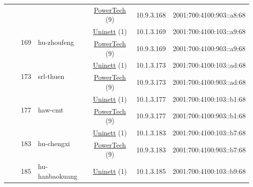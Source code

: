 \begin{small}
\begin{center}
\begin{longtable}{|c|c|c|c|c|c|c|c|}
  &  &  &  & \multicolumn{2}{|c|}{\tiny{\href{http://www.powertech.no}{PowerTech} (9)}} & \tiny{10.9.3.168} & \tiny{2001:700:4100:903::a8:68} \\* \cline{3-3}\cline{4-4}\cline{5-5}\cline{6-6}\cline{7-7}\cline{8-8}
  &  & \multirow{2}{*}{\tiny{169}} & \multicolumn{1}{|l|}{\multirow{2}{*}{\tiny{hu-zhoufeng}}} & \multicolumn{2}{|c|}{\tiny{\href{https://www.uninett.no}{Uninett} (1)}} & \tiny{10.1.3.169} & \tiny{2001:700:4100:103::a9:68} \\* \cline{5-5}\cline{6-6}\cline{7-7}\cline{8-8}
  &  &  &  & \multicolumn{2}{|c|}{\tiny{\href{http://www.powertech.no}{PowerTech} (9)}} & \tiny{10.9.3.169} & \tiny{2001:700:4100:903::a9:68} \\* \cline{3-3}\cline{4-4}\cline{5-5}\cline{6-6}\cline{7-7}\cline{8-8}
  &  & \multirow{2}{*}{\tiny{173}} & \multicolumn{1}{|l|}{\multirow{2}{*}{\tiny{srl-thuen}}} & \multicolumn{2}{|c|}{\tiny{\href{https://www.uninett.no}{Uninett} (1)}} & \tiny{10.1.3.173} & \tiny{2001:700:4100:103::ad:68} \\* \cline{5-5}\cline{6-6}\cline{7-7}\cline{8-8}
  &  &  &  & \multicolumn{2}{|c|}{\tiny{\href{http://www.powertech.no}{PowerTech} (9)}} & \tiny{10.9.3.173} & \tiny{2001:700:4100:903::ad:68} \\* \cline{3-3}\cline{4-4}\cline{5-5}\cline{6-6}\cline{7-7}\cline{8-8}
  &  & \multirow{2}{*}{\tiny{177}} & \multicolumn{1}{|l|}{\multirow{2}{*}{\tiny{haw-cmt}}} & \multicolumn{2}{|c|}{\tiny{\href{https://www.uninett.no}{Uninett} (1)}} & \tiny{10.1.3.177} & \tiny{2001:700:4100:103::b1:68} \\* \cline{5-5}\cline{6-6}\cline{7-7}\cline{8-8}
  &  &  &  & \multicolumn{2}{|c|}{\tiny{\href{http://www.powertech.no}{PowerTech} (9)}} & \tiny{10.9.3.177} & \tiny{2001:700:4100:903::b1:68} \\* \cline{3-3}\cline{4-4}\cline{5-5}\cline{6-6}\cline{7-7}\cline{8-8}
  &  & \multirow{2}{*}{\tiny{183}} & \multicolumn{1}{|l|}{\multirow{2}{*}{\tiny{hu-chengxi}}} & \multicolumn{2}{|c|}{\tiny{\href{https://www.uninett.no}{Uninett} (1)}} & \tiny{10.1.3.183} & \tiny{2001:700:4100:103::b7:68} \\* \cline{5-5}\cline{6-6}\cline{7-7}\cline{8-8}
  &  &  &  & \multicolumn{2}{|c|}{\tiny{\href{http://www.powertech.no}{PowerTech} (9)}} & \tiny{10.9.3.183} & \tiny{2001:700:4100:903::b7:68} \\* \cline{3-3}\cline{4-4}\cline{5-5}\cline{6-6}\cline{7-7}\cline{8-8}
  &  & \multirow{2}{*}{\tiny{185}} & \multicolumn{1}{|l|}{\multirow{2}{*}{\tiny{hu-hanbaokuang}}} & \multicolumn{2}{|c|}{\tiny{\href{https://www.uninett.no}{Uninett} (1)}} & \tiny{10.1.3.185} & \tiny{2001:700:4100:103::b9:68} \\* \cline{5-5}\cline{6-6}\cline{7-7}\cline{8-8}

\end{longtable}
\end{center}
\end{small}
